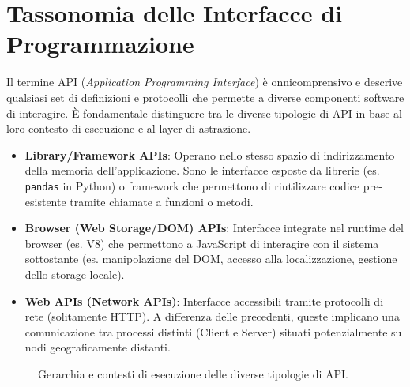 \documentclass[11pt,a4paper]{report}
\begin{document}
\section{Tassonomia delle Interfacce di Programmazione}
Il termine API (\textit{Application Programming Interface}) è onnicomprensivo e descrive qualsiasi set di definizioni e protocolli che permette a diverse componenti software di interagire. \`E fondamentale distinguere tra le diverse tipologie di API in base al loro contesto di esecuzione e al layer di astrazione.

\begin{itemize}[leftmargin=3em]
    \item \textbf{Library/Framework APIs}: Operano nello stesso spazio di indirizzamento della memoria dell'applicazione. Sono le interfacce esposte da librerie (es. \texttt{pandas} in Python) o framework che permettono di riutilizzare codice pre-esistente tramite chiamate a funzioni o metodi.
    \item \textbf{Browser (Web Storage/DOM) APIs}: Interfacce integrate nel runtime del browser (es. V8) che permettono a JavaScript di interagire con il sistema sottostante (es. manipolazione del DOM, accesso alla localizzazione, gestione dello storage locale).
    \item \textbf{Web APIs (Network APIs)}: Interfacce accessibili tramite protocolli di rete (solitamente HTTP). A differenza delle precedenti, queste implicano una comunicazione tra processi distinti (Client e Server) situati potenzialmente su nodi geograficamente distanti.
\end{itemize}

\begin{figure}[ht]
\centering
{}
\caption{Gerarchia e contesti di esecuzione delle diverse tipologie di API.}
\label{fig:api_taxonomy}
\end{figure}
\end{document}
